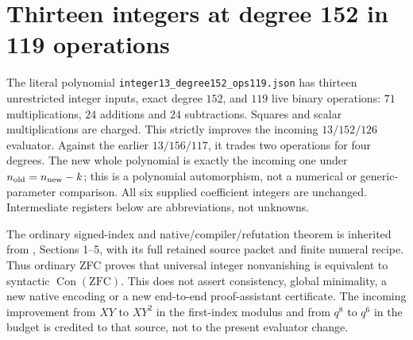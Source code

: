\section{Thirteen integers at degree 152 in 119 operations}
\label{sec:root119}
The literal polynomial \texttt{integer13\_degree152\_ops119.json} has thirteen
unrestricted integer inputs, exact degree $152$, and $119$ live binary operations:
$71$ multiplications, $24$ additions and $24$ subtractions. Squares and scalar
multiplications are charged. This strictly improves the incoming $13/152/126$
evaluator. Against the earlier $13/156/117$, it trades two operations for four
degrees. The new whole polynomial is exactly the incoming one under
$n_{\rm old}=n_{\rm new}-k$; this is a polynomial automorphism, not a numerical
or generic-parameter comparison. All six supplied coefficient integers are
unchanged. Intermediate registers below are abbreviations, not unknowns.

The ordinary signed-index and native/compiler/refutation theorem is inherited
from , Sections 1--5, with its full retained
source packet and finite numeral recipe. Thus ordinary ZFC proves that universal
integer nonvanishing is equivalent to syntactic $\operatorname{Con}(\mathrm{ZFC})$.
This does not assert consistency, global minimality, a new native encoding or
a new end-to-end proof-assistant certificate. The incoming improvement from
$XY$ to $XY^2$ in the first-index modulus and from $q^8$ to $q^6$ in the budget
is credited to that source, not to the present evaluator change.


